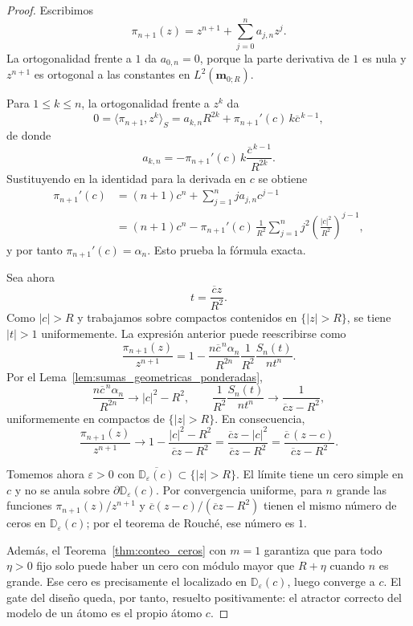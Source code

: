 \begin{proof}
	Escribimos
	\[
		\pi_{n+1}(z)=z^{n+1}+\sum_{j=0}^n a_{j,n}z^j.
	\]
	La ortogonalidad frente a $1$ da $a_{0,n}=0$, porque la parte derivativa de $1$ es nula y $z^{n+1}$ es ortogonal a las constantes en $L^2(\mathbf m_{0;R})$.

	Para $1\le k\le n$, la ortogonalidad frente a $z^k$ da
	\[
		0=\langle \pi_{n+1},z^k\rangle_S
		=a_{k,n}R^{2k}+\pi_{n+1}'(c)\,k\overline c^{\,k-1},
	\]
	de donde
	\[
		a_{k,n}=-\pi_{n+1}'(c)\,k\frac{\overline c^{\,k-1}}{R^{2k}}.
	\]
	Sustituyendo en la identidad para la derivada en $c$ se obtiene
	\begin{align*}
		\pi_{n+1}'(c)
		 & =(n+1)c^n+\sum_{j=1}^n j a_{j,n}c^{j-1} \\
		 & =(n+1)c^n-\pi_{n+1}'(c)\,\frac1{R^2}
		\sum_{j=1}^n j^2\left(\frac{|c|^2}{R^2}\right)^{j-1},
	\end{align*}
	y por tanto $\pi_{n+1}'(c)=\alpha_n$. Esto prueba la fórmula exacta.

	Sea ahora
	\[
		t=\frac{\overline c z}{R^2}.
	\]
	Como $|c|>R$ y trabajamos sobre compactos contenidos en $\{|z|>R\}$, se tiene $|t|>1$ uniformemente. La expresión anterior puede reescribirse como
	\[
		\frac{\pi_{n+1}(z)}{z^{n+1}}
		=
		1-
		\frac{n\overline c^{\,n}\alpha_n}{R^{2n}}
		\frac{1}{R^2}
		\frac{S_n(t)}{nt^n}.
	\]
	Por el Lema~\ref{lem:sumas_geometricas_ponderadas},
	\[
		\frac{n\overline c^{\,n}\alpha_n}{R^{2n}}
		\longrightarrow |c|^2-R^2,
		\qquad
		\frac{1}{R^2}\frac{S_n(t)}{nt^n}\longrightarrow \frac{1}{\overline c z-R^2},
	\]
	uniformemente en compactos de $\{|z|>R\}$. En consecuencia,
	\[
		\frac{\pi_{n+1}(z)}{z^{n+1}}
		\longrightarrow
		1-\frac{|c|^2-R^2}{\overline c z-R^2}
		=
		\frac{\overline c z-|c|^2}{\overline c z-R^2}
		=
		\frac{\overline c\,(z-c)}{\overline c z-R^2}.
	\]

	Tomemos ahora $\varepsilon>0$ con $\overline{\mathbb D_\varepsilon(c)}\subset\{|z|>R\}$. El límite tiene un cero simple en $c$ y no se anula sobre $\partial\mathbb D_\varepsilon(c)$. Por convergencia uniforme, para $n$ grande las funciones $\pi_{n+1}(z)/z^{n+1}$ y $\overline c(z-c)/(\overline c z-R^2)$ tienen el mismo número de ceros en $\mathbb D_\varepsilon(c)$; por el teorema de Rouché, ese número es $1$.

	Además, el Teorema~\ref{thm:conteo_ceros} con $m=1$ garantiza que para todo $\eta>0$ fijo solo puede haber un cero con módulo mayor que $R+\eta$ cuando $n$ es grande. Ese cero es precisamente el localizado en $\mathbb D_\varepsilon(c)$, luego converge a $c$. El gate del diseño queda, por tanto, resuelto positivamente: el atractor correcto del modelo de un átomo es el propio átomo $c$.
\end{proof}

